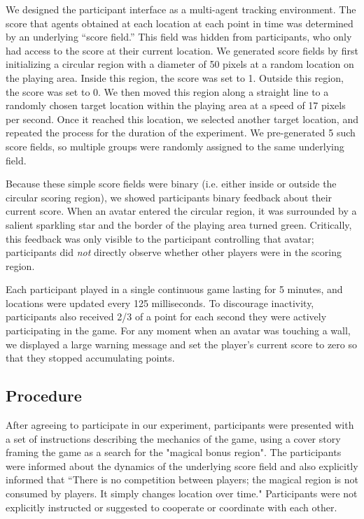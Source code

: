 \documentclass[12pt,letterpaper]{article}
\begin{document}
We designed the participant interface as a multi-agent tracking environment.
The score that agents obtained at each location at each point in time was determined by an underlying ``score field.'' 
This field was hidden from participants, who  only had access to the score at their current location. 
We generated score fields by first initializing a circular region with a diameter of 50 pixels at a random location on the playing area. 
Inside this region, the score was set to 1.
Outside this region, the score was set to 0.
We then moved this region along a straight line to a randomly chosen target location within the playing area at a speed of 17 pixels per second.
Once it reached this location, we selected another target location, and repeated the process for the duration of the experiment.
We pre-generated 5 such score fields, so multiple groups were randomly assigned to the same underlying field.  

Because these simple score fields were binary (i.e. either inside or outside the circular scoring region), we showed participants binary feedback about their current score.
When an avatar entered the circular region, it was surrounded by a salient sparkling star and the border of the playing area turned green. 
Critically, this feedback was only visible to the participant controlling that avatar; participants did \emph{not} directly observe whether other players were in the scoring region.

Each participant played in a single
continuous game lasting for 5 minutes, and locations were updated every 125 milliseconds. 
To discourage inactivity, participants also received 2/3 of a point for each second they were actively participating in the game.
For any moment when an avatar was touching a wall, we displayed a large warning message and set the player's current score to zero so that they stopped accumulating points.

\subsection{Procedure}

After agreeing to participate in our experiment, participants were presented with a set of instructions describing the mechanics of the game, using a cover story framing the game as a search for the "magical bonus region".  
The participants were informed about the dynamics of the underlying score field and also explicitly informed that ``There is no competition between players; the magical region is not consumed by players. It simply changes location over time." 
Participants were not explicitly instructed or suggested to cooperate or coordinate with each other.
\end{document}

